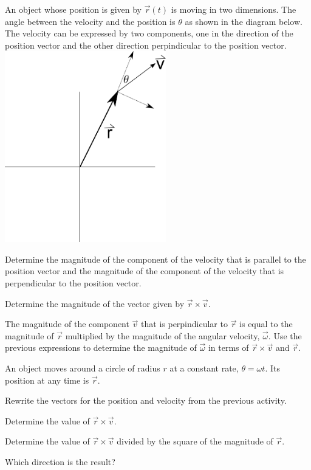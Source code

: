 \begin{problem}
\item An object whose position is given by $\vec{r}(t)$ is moving in
  two dimensions. The angle between the velocity and the position is
  $\theta$ as shown in the diagram below. The velocity can be
  expressed by two components, one in the direction of the position
  vector and the other direction
  perpindicular to the position vector. \\
  \includegraphics[width=7cm]{ink/week12/angularComponents}
  \begin{subproblem}
  \item Determine the magnitude of
    the component of the velocity that is parallel to the position
    vector and the magnitude of the component of the velocity that is
    perpendicular to the position vector.  \vfill
  \item Determine the magnitude of the vector given by
    $\vec{r}\times\vec{v}$.
    \vfill
  \item The magnitude of the component $\vec{v}$ that is perpindicular
    to $\vec{r}$ is equal to the magnitude of $\vec{r}$ multiplied by
    the magnitude of the angular velocity, $\vec{\omega}$.  Use the
    previous expressions to determine the magnitude of $\vec{\omega}$
    in terms of $\vec{r}\times\vec{v}$ and $\vec{r}$.  
    \vfill
  \end{subproblem}
  \clearpage
\item An object moves around a circle of radius $r$  at a constant
  rate, $\theta=\omega t$. Its position at any time is $\vec{r}$.
  \begin{subproblem}
  \item Rewrite the vectors for the position and velocity from the
    previous activity.
    \vfill
  \item Determine the value of $\vec{r}\times\vec{v}$.
    \vfill
  \item Determine the value of $\vec{r}\times\vec{v}$ divided by the
    square of the magnitude of $\vec{r}$.
    \vfill
  \item Which direction is the result?
    \vfill
  \end{subproblem}
\end{problem}

